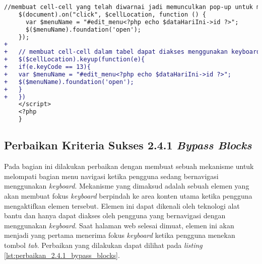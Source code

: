 \begin{itemize}
\begin{lstlisting}[frame=single, label={lst:perbaikan_2.1.1_keyboard_entri_jadwal_dosen}, language=diff, caption=Perbaikan Kriteria Sukses 2.1.1 - Penggunaan \textit{Keyboard} pada Halaman Entri Jadwal Dosen]
    //membuat cell-cell yang telah diwarnai jadi memunculkan pop-up untuk mengedit jadwal ketika diklik oleh mouse
    $(document).on("click", $cellLocation, function () {
      var $menuName = "#edit_menu<?php echo $dataHariIni->id ?>";
      $($menuName).foundation('open');
    });
+
+   // membuat cell-cell dalam tabel dapat diakses menggunakan keyboard
+   $($cellLocation).keyup(function(e){
+   if(e.keyCode == 13){
+   var $menuName = "#edit_menu<?php echo $dataHariIni->id ?>";
+   $($menuName).foundation('open');
+   }
+   })
    </script>
    <?php
    }
\end{lstlisting}
\end{itemize}

\subsection{Perbaikan Kriteria Sukses 2.4.1 \textit{Bypass Blocks}}
\label{subsec:perbaikan_kriteria_sukses_2.4.1}
Pada bagian ini dilakukan perbaikan dengan membuat sebuah mekanisme untuk melompati bagian menu navigasi ketika pengguna sedang bernavigasi menggunakan \textit{keyboard}. Mekanisme yang dimaksud adalah sebuah elemen yang akan membuat fokus \textit{keyboard} berpindah ke area konten utama ketika pengguna mengaktifkan elemen tersebut. Elemen ini dapat dikenali oleh teknologi alat bantu dan hanya dapat diakses oleh pengguna yang bernavigasi dengan menggunakan \textit{keyboard}. Saat halaman web selesai dimuat, elemen ini akan menjadi yang pertama menerima fokus \textit{keyboard} ketika pengguna menekan tombol \textit{tab}. Perbaikan yang dilakukan dapat dilihat pada \textit{listing} \ref{lst:perbaikan_2.4.1_bypass_blocks}.
